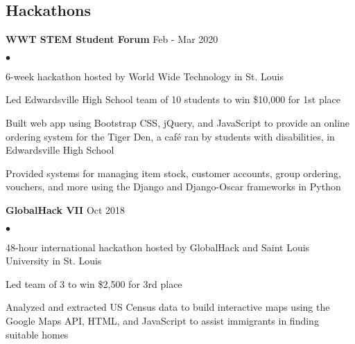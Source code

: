 \documentclass[margin,line]{res}
\newenvironment{list2}{
  \begin{list}{$\bullet$}{%
      \setlength{\itemsep}{0in}
      \setlength{\parsep}{0in} \setlength{\parskip}{0in}
      \setlength{\topsep}{0in} \setlength{\partopsep}{0in} 
      \setlength{\leftmargin}{0.2in}}}{\end{list}}
\begin{document}
\begin{resume}
  \section{\sc Hackathons}

  {\bf WWT STEM Student Forum} \hfill Feb - Mar 2020

  \begin{list2}
    \item 6-week hackathon hosted by World Wide Technology in St. Louis
    \item Led Edwardsville High School team of 10 students to win \$10,000 for 1st place
    \item Built web app using Bootstrap CSS, jQuery, and JavaScript to provide an online ordering system for the
    Tiger Den, a café ran by students with disabilities, in Edwardsville High School
    \item Provided systems for managing item stock, customer accounts, group ordering, vouchers, and more
    using the Django and Django-Oscar frameworks in Python
  \end{list2}

  {\bf GlobalHack VII} \hfill Oct 2018

  \begin{list2}
    \item 48-hour international hackathon hosted by GlobalHack and Saint Louis University in St. Louis
    \item Led team of 3 to win \$2,500 for 3rd place
    \item Analyzed and extracted US Census data to build interactive maps using the Google Maps API, HTML, and JavaScript to assist immigrants in finding suitable homes
  \end{list2}




\end{resume}
\end{document}
